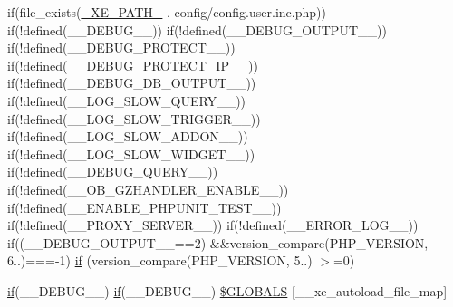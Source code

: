 \begin{DoxyCompactItemize}
if(file\+\_\+exists(\hyperlink{config_8inc_8php_a5387c7a3f2aa38adf16f324cee88db88}{\+\_\+\+X\+E\+\_\+\+P\+A\+T\+H\+\_\+} . \textquotesingle{}config/config.\+user.\+inc.\+php\textquotesingle{})) if(!defined(\textquotesingle{}\+\_\+\+\_\+\+D\+E\+B\+U\+G\+\_\+\+\_\+\textquotesingle{})) if(!defined(\textquotesingle{}\+\_\+\+\_\+\+D\+E\+B\+U\+G\+\_\+\+O\+U\+T\+P\+U\+T\+\_\+\+\_\+\textquotesingle{})) if(!defined(\textquotesingle{}\+\_\+\+\_\+\+D\+E\+B\+U\+G\+\_\+\+P\+R\+O\+T\+E\+C\+T\+\_\+\+\_\+\textquotesingle{})) if(!defined(\textquotesingle{}\+\_\+\+\_\+\+D\+E\+B\+U\+G\+\_\+\+P\+R\+O\+T\+E\+C\+T\+\_\+\+I\+P\+\_\+\+\_\+\textquotesingle{})) if(!defined(\textquotesingle{}\+\_\+\+\_\+\+D\+E\+B\+U\+G\+\_\+\+D\+B\+\_\+\+O\+U\+T\+P\+U\+T\+\_\+\+\_\+\textquotesingle{})) if(!defined(\textquotesingle{}\+\_\+\+\_\+\+L\+O\+G\+\_\+\+S\+L\+O\+W\+\_\+\+Q\+U\+E\+R\+Y\+\_\+\+\_\+\textquotesingle{})) if(!defined(\textquotesingle{}\+\_\+\+\_\+\+L\+O\+G\+\_\+\+S\+L\+O\+W\+\_\+\+T\+R\+I\+G\+G\+E\+R\+\_\+\+\_\+\textquotesingle{})) if(!defined(\textquotesingle{}\+\_\+\+\_\+\+L\+O\+G\+\_\+\+S\+L\+O\+W\+\_\+\+A\+D\+D\+O\+N\+\_\+\+\_\+\textquotesingle{})) if(!defined(\textquotesingle{}\+\_\+\+\_\+\+L\+O\+G\+\_\+\+S\+L\+O\+W\+\_\+\+W\+I\+D\+G\+E\+T\+\_\+\+\_\+\textquotesingle{})) if(!defined(\textquotesingle{}\+\_\+\+\_\+\+D\+E\+B\+U\+G\+\_\+\+Q\+U\+E\+R\+Y\+\_\+\+\_\+\textquotesingle{})) if(!defined(\textquotesingle{}\+\_\+\+\_\+\+O\+B\+\_\+\+G\+Z\+H\+A\+N\+D\+L\+E\+R\+\_\+\+E\+N\+A\+B\+L\+E\+\_\+\+\_\+\textquotesingle{})) if(!defined(\textquotesingle{}\+\_\+\+\_\+\+E\+N\+A\+B\+L\+E\+\_\+\+P\+H\+P\+U\+N\+I\+T\+\_\+\+T\+E\+S\+T\+\_\+\+\_\+\textquotesingle{})) if(!defined(\textquotesingle{}\+\_\+\+\_\+\+P\+R\+O\+X\+Y\+\_\+\+S\+E\+R\+V\+E\+R\+\_\+\+\_\+\textquotesingle{})) if(!defined(\textquotesingle{}\+\_\+\+\_\+\+E\+R\+R\+O\+R\+\_\+\+L\+O\+G\+\_\+\+\_\+\textquotesingle{})) if((\+\_\+\+\_\+\+D\+E\+B\+U\+G\+\_\+\+O\+U\+T\+P\+U\+T\+\_\+\+\_\+==2) \&\&version\+\_\+compare(P\+H\+P\+\_\+\+V\+E\+R\+S\+I\+ON, \textquotesingle{}6..\textquotesingle{})===-\/1) \hyperlink{config_8inc_8php_a73b98c0274e28635a594091f9ca43cb4}{if} (version\+\_\+compare(P\+H\+P\+\_\+\+V\+E\+R\+S\+I\+ON, \textquotesingle{}5..\textquotesingle{}) $>$=0)
\item 
\hyperlink{config_8inc_8php_a73b98c0274e28635a594091f9ca43cb4}{if}(\+\_\+\+\_\+\+D\+E\+B\+U\+G\+\_\+\+\_\+) \hyperlink{config_8inc_8php_a73b98c0274e28635a594091f9ca43cb4}{if}(\+\_\+\+\_\+\+D\+E\+B\+U\+G\+\_\+\+\_\+) \hyperlink{config_8inc_8php_aa2bc5ba294851602749ff47c954d16ae}{\$\+G\+L\+O\+B\+A\+LS} \mbox{[}\textquotesingle{}\+\_\+\+\_\+xe\+\_\+autoload\+\_\+file\+\_\+map\textquotesingle{}\mbox{]}
\end{DoxyCompactItemize}


